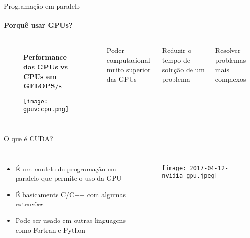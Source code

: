 \begin{frame}[t]{Programação em paralelo}
    \framesubtitle{Porquê usar GPUs?}
    \begin{columns}
        \begin{figure}
            \centering
            \textbf{Performance das GPUs vs CPUs em GFLOPS/s}\par\medskip
            \texttt{[image: gpuvccpu.png]}
        \end{figure}
        \itemize
        \item Poder computacional muito superior das GPUs
        \item Reduzir o tempo de solução de um problema
        \item Resolver problemas mais complexos
    \end{columns}
        
\end{frame}
\begin{frame}[t]{O que é CUDA?}
    \begin{columns}
            \Large
            \begin{itemize}
                \item É um modelo de programação em paralelo que permite o uso da GPU
                \item É basicamente C/C++ com algumas extensões
                \item Pode ser usado em outras linguagens como Fortran e Python 
            \end{itemize}
            \begin{figure}
                \texttt{[image: 2017-04-12-nvidia-gpu.jpeg]}
            \end{figure}  
    \end{columns}
\end{frame}
